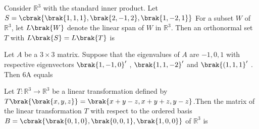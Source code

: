 \item Consider $\mathbb{R}^{3}$ with the standard inner product. Let $ S=\cbrak{\brak{1,1,1}, \brak{2,-1,2}, \brak{1,-2,1}}$ For a subset $W$ of $\mathbb{R}^{3}$, let $L\brak{W}$ denote the linear span of $W$ in $\mathbb{R}^{3}$. Then an orthonormal set $T$ with $L\brak{S}=L\brak{T}$ is  
\begin{enumerate}
\begin{multicols}{2}
\item {}
\item {}
\item {}
\item {}
\end{multicols}
\end{enumerate}
\item Let $A$ be a $3\times3$ matrix. Suppose that the eigenvalues of $A$ are $-1, 0, 1$ with respective eigenvectors $\brak{1, -1, 0}^{\prime}$ , $\brak{1, 1, -2}^{\prime}$ and $\brak{(1, 1, 1}^{\prime}$ . Then 6A equals
\begin{enumerate}
\begin{multicols}{2}
\item {}
\item {}
\item {}
\item {}
\end{multicols}
\end{enumerate}
\item Let $T: \mathbb{R}^3 \rightarrow \mathbb{R}^3$ be a linear transformation defined by $T\brak{\brak{x, y, z}} = \brak{x + y - z, x + y + z, y - z}$.Then the matrix of the linear transformation $T$ with respect to the ordered basis $B = \cbrak{\brak{0, 1, 0}, \brak{0, 0, 1}, \brak{1, 0, 0}}$ of $\mathbb{R}^3$ is  
